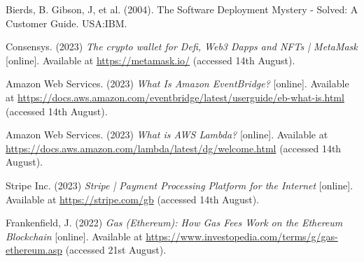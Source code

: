  \noindent [60] Bierds, B. Gibson, J, et al. (2004). The Software Deployment Mystery - Solved: A Customer Guide. USA:IBM.
 \vspace{0.2cm}

 \noindent [61] Consensys. (2023) \textit{The crypto wallet for Defi, Web3 Dapps and NFTs | MetaMask} [online]. Available at \url{https://metamask.io/} (accessed 14th August).
 \vspace{0.2cm}

 \noindent [62] Amazon Web Services. (2023) \textit{What Is Amazon EventBridge?} [online]. Available at \url{https://docs.aws.amazon.com/eventbridge/latest/userguide/eb-what-is.html} (accessed 14th August).
 \vspace{0.2cm}

 \noindent [63] Amazon Web Services. (2023) \textit{What is AWS Lambda?} [online]. Available at \url{https://docs.aws.amazon.com/lambda/latest/dg/welcome.html} (accessed 14th August).
 \vspace{0.2cm}

 \noindent [64] Stripe Inc. (2023) \textit{Stripe | Payment Processing Platform for the Internet} [online]. Available at \url{https://stripe.com/gb} (accessed 14th August).
 \vspace{0.2cm}

 \noindent [65] Frankenfield, J. (2022) \textit{Gas (Ethereum): How Gas Fees Work on the Ethereum Blockchain} [online]. Available at \url{https://www.investopedia.com/terms/g/gas-ethereum.asp} (accessed 21st August).
 \vspace{0.2cm}

\newpage
